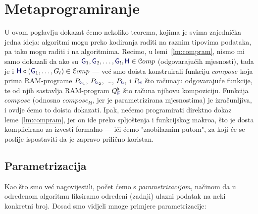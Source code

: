\chapter{Metaprogramiranje}

U ovom poglavlju dokazat ćemo nekoliko teorema, kojima je svima zajednička jedna ideja: algoritmi mogu preko kodiranja raditi na raznim tipovima podataka, pa tako mogu raditi i na algoritmima. Recimo, u lemi~\ref{lm:compram}, nismo mi samo dokazali da ako su $\f G_1,\f G_2,\dotsc,\f G_l,\f H\in\mathcal Comp$ (odgovarajućih mjesnosti), tada je i $\f H\circ(\f G_1,\dotsc,G_l)\in\mathcal Comp$ --- već smo doista konstruirali funkciju $compose$ koja prima RAM-programe $P_{\f G_1}$, $P_{\f G_2}$,~\ldots, $P_{\f G_l}$ i $P_{\f H}$ što računaju odgovarajuće funkcije, te od njih sastavlja RAM-program $Q_{\f F}^\flat$ što računa njihovu kompoziciju. Funkcija $compose$ (odnosno $compose_{kl}$, jer je parametrizirana mjesnostima) je izračunljiva, i ovdje ćemo to doista dokazati. Ipak, nećemo programirati direktno dokaz leme~\ref{lm:compram}, jer on ide preko spljoštenja i funkcijskog makroa, što je dosta komplicirano za izvesti formalno --- ići ćemo "zaobilaznim putom", za koji će se poslije ispostaviti da je zapravo prilično koristan.

\section{Parametrizacija}

Kao što smo već nagovijestili, počet ćemo s \emph{parametrizacijom}, načinom da u od\-re\-đe\-nom algoritmu fiksiramo određeni (zadnji) ulazni podatak na neki konkretni broj. Dosad smo vidjeli mnoge primjere parametrizacije:

